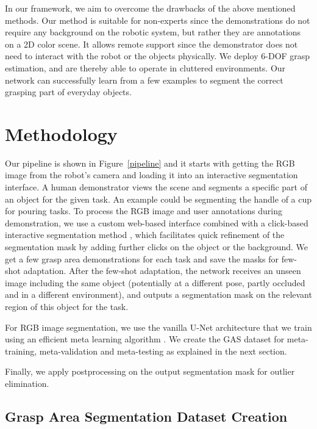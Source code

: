 \documentclass[letterpaper]{article} %
\begin{document}
In our framework, we aim to overcome the drawbacks of the above mentioned methods. Our method is suitable for non-experts since the demonstrations do not require any background on the robotic system, but rather they are annotations on a 2D color scene. It allows remote support since the demonstrator does not need to interact with the robot or the objects physically. We deploy 6-DOF grasp estimation, and are thereby able to operate in cluttered environments. Our network can successfully learn from a few examples to segment the correct grasping part of everyday objects. 


\section{Methodology}
\label{sec:methodology}

Our pipeline is shown in Figure~\ref{pipeline} and it starts with getting the RGB image from the robot's camera and loading it into an interactive segmentation interface. A human demonstrator views the scene and segments a specific part of an object for the given task. An example could be segmenting the handle of a cup for pouring tasks. To process the RGB image and user annotations during demonstration, we use a custom web-based interface combined with a click-based interactive segmentation method \cite{sofiiuk2020f}, which facilitates quick refinement of the segmentation mask by adding further clicks on the object or the background. We get a few grasp area demonstrations for each task and save the masks for few-shot adaptation. After the few-shot adaptation, the network receives an unseen image including the same object (potentially at a different pose, partly occluded and in a different environment), and outputs a segmentation mask on the relevant region of this object for the task. 

For RGB image segmentation, we use the vanilla U-Net architecture \cite{ronneberger2015u} that we train using an efficient meta learning algorithm \cite{nichol2018reptile}. We create the GAS dataset for meta-training, meta-validation and meta-testing as explained in the next section.

Finally, we apply postprocessing on the output segmentation mask for outlier elimination.

\subsection{Grasp Area Segmentation Dataset Creation}
\label{dataset_section}
\end{document}
